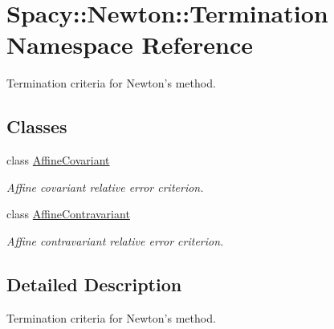\hypertarget{namespaceSpacy_1_1Newton_1_1Termination}{\section{Spacy\-:\-:Newton\-:\-:Termination Namespace Reference}
\label{namespaceSpacy_1_1Newton_1_1Termination}
}


Termination criteria for Newton's method.  


\subsection*{Classes}
\begin{DoxyCompactItemize}
\item 
class \hyperlink{classSpacy_1_1Newton_1_1Termination_1_1AffineCovariant}{Affine\-Covariant}
\begin{DoxyCompactList}\small\item\em Affine covariant relative error criterion. \end{DoxyCompactList}\item 
class \hyperlink{classSpacy_1_1Newton_1_1Termination_1_1AffineContravariant}{Affine\-Contravariant}
\begin{DoxyCompactList}\small\item\em Affine contravariant relative error criterion. \end{DoxyCompactList}\end{DoxyCompactItemize}


\subsection{Detailed Description}
Termination criteria for Newton's method. 